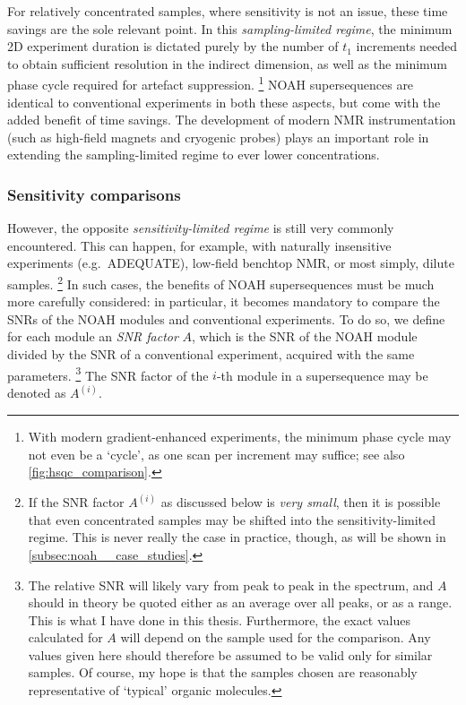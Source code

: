 For relatively concentrated samples, where sensitivity is not an issue, these time savings are the sole relevant point.
In this \textit{sampling-limited regime}, the minimum 2D experiment duration is dictated purely by the number of $t_1$ increments needed to obtain sufficient resolution in the indirect dimension, as well as the minimum phase cycle required for artefact suppression.%
\footnote{With modern gradient-enhanced experiments, the minimum phase cycle may not even be a `cycle', as one scan per increment may suffice; see also \cref{fig:hsqc_comparison}.}
NOAH supersequences are identical to conventional experiments in both these aspects, but come with the added benefit of time savings.
The development of modern NMR instrumentation (such as high-field magnets and cryogenic probes) plays an important role in extending the sampling-limited regime to ever lower concentrations.


\subsubsection{Sensitivity comparisons}

However, the opposite \textit{sensitivity-limited regime} is still very commonly encountered.
This can happen, for example, with naturally insensitive experiments (e.g.\ ADEQUATE), low-field benchtop NMR, or most simply, dilute samples.%
\footnote{If the SNR factor $A^{(i)}$ as discussed below is \textit{very small}, then it is possible that even concentrated samples may be shifted into the sensitivity-limited regime. This is never really the case in practice, though, as will be shown in \cref{subsec:noah__case_studies}.}
In such cases, the benefits of NOAH supersequences must be much more carefully considered: in particular, it becomes mandatory to compare the SNRs of the NOAH modules and conventional experiments.
To do so, we define for each module an \textit{SNR factor} $A$, which is the SNR of the NOAH module divided by the SNR of a conventional experiment, acquired with the same parameters.%
\footnote{The relative SNR will likely vary from peak to peak in the spectrum, and $A$ should in theory be quoted either as an average over all peaks, or as a range.
This is what I have done in this thesis.
Furthermore, the exact values calculated for $A$ will depend on the sample used for the comparison.
Any values given here should therefore be assumed to be valid only for similar samples.
Of course, my hope is that the samples chosen are reasonably representative of `typical' organic molecules.}
The SNR factor of the $i$-th module in a supersequence may be denoted as $A^{(i)}$.

